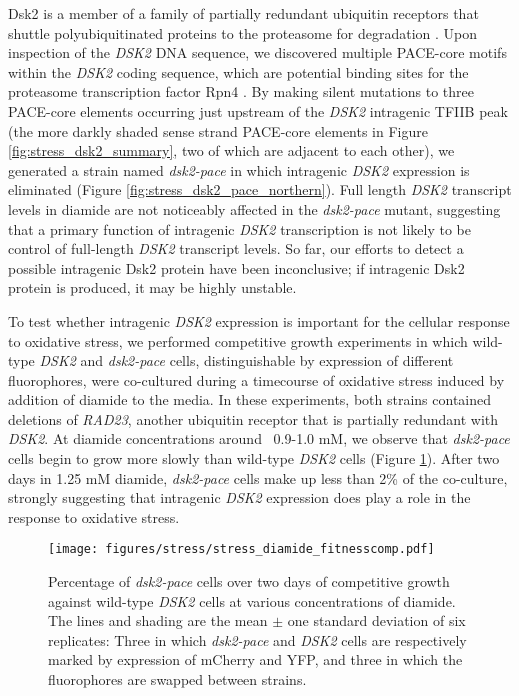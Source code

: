 Dsk2 is a member of a family of partially redundant ubiquitin receptors that shuttle polyubiquitinated proteins to the proteasome for degradation \citep{funakoshi2002}.
Upon inspection of the \textit{DSK2} DNA sequence, we discovered multiple PACE-core motifs within the \textit{DSK2} coding sequence, which are potential binding sites for the proteasome transcription factor Rpn4 \citep{shirozu2015}.
By making silent mutations to three PACE-core elements occurring just upstream of the \textit{DSK2} intragenic TFIIB peak (the more darkly shaded sense strand PACE-core elements in Figure \ref{fig:stress_dsk2_summary}, two of which are adjacent to each other), we generated a strain named \textit{dsk2-pace} in which intragenic \textit{DSK2} expression is eliminated (Figure \ref{fig:stress_dsk2_pace_northern}).
Full length \textit{DSK2} transcript levels in diamide are not noticeably affected in the \textit{dsk2-pace} mutant, suggesting that a primary function of intragenic \textit{DSK2} transcription is not likely to be control of full-length \textit{DSK2} transcript levels.
So far, our efforts to detect a possible intragenic Dsk2 protein have been inconclusive; if intragenic Dsk2 protein is produced, it may be highly unstable.

To test whether intragenic \textit{DSK2} expression is important for the cellular response to oxidative stress, we performed competitive growth experiments in which wild-type \textit{DSK2} and \textit{dsk2-pace} cells, distinguishable by expression of different fluorophores, were co-cultured during a timecourse of oxidative stress induced by addition of diamide to the media.
In these experiments, both strains contained deletions of \textit{RAD23}, another ubiquitin receptor that is partially redundant with \textit{DSK2}.
At diamide concentrations around ~0.9-1.0 mM, we observe that \textit{dsk2-pace} cells begin to grow more slowly than wild-type \textit{DSK2} cells (Figure \ref{fig:stress_diamide_fitnesscomp}).
After two days in 1.25 mM diamide, \textit{dsk2-pace} cells make up less than 2\% of the co-culture, strongly suggesting that intragenic \textit{DSK2} expression does play a role in the response to oxidative stress.

\begin{figure}[h]
    \texttt{[image: figures/stress/stress\_diamide\_fitnesscomp.pdf]}
    \caption[Percentage of \textit{dsk2-pace} cells over two days of competitive growth against wild-type \textit{DSK2} cells at various concentrations of diamide.]{Percentage of \textit{dsk2-pace} cells over two days of competitive growth against wild-type \textit{DSK2} cells at various concentrations of diamide. The lines and shading are the mean $\pm$ one standard deviation of six replicates: Three in which \textit{dsk2-pace} and \textit{DSK2} cells are respectively marked by expression of mCherry and YFP, and three in which the fluorophores are swapped between strains.}
    \label{fig:stress_diamide_fitnesscomp}
\end{figure}

